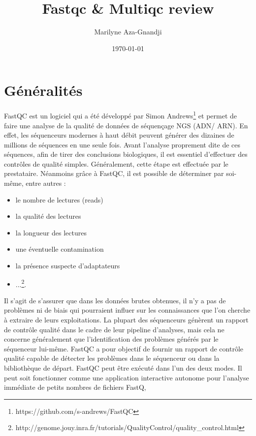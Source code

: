 \documentclass[a4paper,11pt]{article}
\begin{document}
\title{Fastqc \& Multiqc review}
\author{Marilyne Aza-Gnandji}
\date{\today}

\maketitle
\tableofcontents

\section{Généralités}

FastQC est un logiciel qui a été développé par Simon
Andrews\footnote{{https://github.com/s-andrews/FastQC}} et permet de
faire une analyse de la qualité de données de séquençage NGS (ADN/
ARN). En effet, les séquenceurs modernes à haut débit peuvent générer
des dizaines de millions de séquences en une seule fois.  Avant
l'analyse proprement dite de ces séquences, afin de tirer des
conclusions biologiques, il est essentiel d'effectuer des contrôles de
qualité simples. Généralement, cette étape est effectuée
par le prestataire. Néanmoins grâce à FastQC, il est possible de
déterminer par soi-même, entre autres :
\begin{itemize}
  \item[\textbullet] le nombre de lectures (reads)
   \item[\textbullet] la qualité des lectures
    \item[\textbullet] la longueur des lectures
     \item[\textbullet] une éventuelle contamination
     \item[\textbullet] la présence suspecte d'adaptateurs
       \item[\textbullet]
         ...\footnote{{http://genome.jouy.inra.fr/tutorials/QualityControl/quality_control.html}}.
\end{itemize}
Il s'agit de s'assurer que dans les données brutes
obtenues, il n'y a pas de problèmes ni de biais qui pourraient influer
sur les connaissances que l'on cherche à extraire de leurs
exploitations. La plupart des séquenceurs génèrent un rapport de
contrôle qualité dans le cadre de leur pipeline d’analyses, mais cela
ne concerne généralement que l’identification des problèmes générés
par le séquenceur lui-même.
FastQC a pour objectif de fournir un rapport de contrôle qualité
capable de détecter les problèmes dans le séquenceur ou dans la
bibliothèque de départ. FastQC peut être exécuté dans l'un des deux
modes. Il peut soit fonctionner comme une application interactive
autonome pour l’analyse immédiate de petits nombres de fichiers FastQ,
\end{document}
